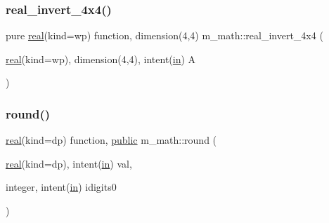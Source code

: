 \mbox{\label{namespacem__math_a09e9433fe80e44fc0b63d815d2ee389a}} 
\subsubsection{\texorpdfstring{real\+\_\+invert\+\_\+4x4()}{real\_invert\_4x4()}}
{\footnotesize\ttfamily pure \hyperlink{read__watch_83_8txt_abdb62bde002f38ef75f810d3a905a823}{real}(kind=wp) function, dimension(4,4) m\+\_\+math\+::real\+\_\+invert\+\_\+4x4 (\begin{DoxyParamCaption}\item[{\hyperlink{read__watch_83_8txt_abdb62bde002f38ef75f810d3a905a823}{real}(kind=wp), dimension(4,4), intent(\hyperlink{M__journal_83_8txt_afce72651d1eed785a2132bee863b2f38}{in})}]{A }\end{DoxyParamCaption})\hspace{0.3cm}{\ttfamily [private]}}

\mbox{\label{namespacem__math_a11ed560b0452d8338ff4958a88cab4de}} 
\subsubsection{\texorpdfstring{round()}{round()}}
{\footnotesize\ttfamily \hyperlink{read__watch_83_8txt_abdb62bde002f38ef75f810d3a905a823}{real}(kind=dp) function, \hyperlink{M__stopwatch_83_8txt_a2f74811300c361e53b430611a7d1769f}{public} m\+\_\+math\+::round (\begin{DoxyParamCaption}\item[{\hyperlink{read__watch_83_8txt_abdb62bde002f38ef75f810d3a905a823}{real}(kind=dp), intent(\hyperlink{M__journal_83_8txt_afce72651d1eed785a2132bee863b2f38}{in})}]{val,  }\item[{integer, intent(\hyperlink{M__journal_83_8txt_afce72651d1eed785a2132bee863b2f38}{in})}]{idigits0 }\end{DoxyParamCaption})}

\mbox{\label{namespacem__math_aa12c4a23dac498e04f8bff1340fc8b30}} 

